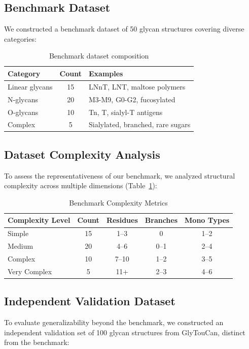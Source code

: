 \documentclass[11pt,a4paper]{article}
\begin{document}
\subsection{Benchmark Dataset}

We constructed a benchmark dataset of 50 glycan structures covering diverse categories:

\begin{table}[h]
\centering
\begin{tabular}{lcl}
\toprule
Category & Count & Examples \\
\midrule
Linear glycans & 15 & LNnT, LNT, maltose polymers \\
N-glycans & 20 & M3-M9, G0-G2, fucosylated \\
O-glycans & 10 & Tn, T, sialyl-T antigens \\
Complex & 5 & Sialylated, branched, rare sugars \\
\bottomrule
\end{tabular}
\caption{Benchmark dataset composition}
\end{table}

\subsection{Dataset Complexity Analysis}

To assess the representativeness of our benchmark, we analyzed structural complexity across multiple dimensions (Table~\ref{tab:complexity}):

\begin{table}[h]
\centering
\caption{Benchmark Complexity Metrics}
\begin{tabular}{lcccc}
\toprule
Complexity Level & Count & Residues & Branches & Mono Types \\
\midrule
Simple & 15 & 1--3 & 0 & 1--2 \\
Medium & 20 & 4--6 & 0--1 & 2--4 \\
Complex & 10 & 7--10 & 1--2 & 3--5 \\
Very Complex & 5 & 11+ & 2--3 & 4--6 \\
\bottomrule
\end{tabular}
\label{tab:complexity}
\end{table}

\subsection{Independent Validation Dataset}

To evaluate generalizability beyond the benchmark, we constructed an independent validation set of 100 glycan structures from GlyTouCan, distinct from the benchmark:
\end{document}
